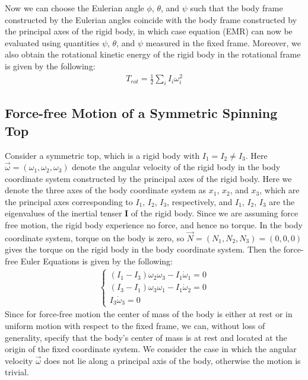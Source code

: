 \documentclass[11pt,oneside]{book}
\theoremstyle{break}
\theoremstyle{break}
\begin{document}
Now we can choose the Eulerian angle $\phi$, $\theta$, and $\psi$  such that the body frame constructed by the Eulerian angles coincide with the body frame constructed by the principal axes of the rigid body,  in which case equation (EMR) can now be evaluated using quantities $\psi$, $\theta$, and $\psi$ measured in the fixed frame. Moreover, we also obtain the rotational kinetic energy of the rigid body in the rotational frame is given by the following:
\begin{align*}
T_{rot}= \frac{1}{2}\sum_i I_i \omega_i^2
\end{align*}

\subsection*{Force-free Motion of a Symmetric Spinning Top}
Consider a symmetric top, which is a rigid body with $I_1 = I_2 \neq I_3$. Here $\vec{\omega} = (\omega_1,\omega_2,\omega_3)$ denote the angular velocity of the rigid body in the body coordinate system constructed by the principal axes of the rigid body. Here we denote the three axes of the body coordinate system as $x_1$, $x_2$, and $x_3$, which are the principal axes corresponding to $I_1$, $I_2$, $I_3$, respectively, and $I_1$, $I_2$, $I_3$ are the eigenvalues of the inertial tenser $\mathbf{I}$ of the rigid body. Since we are assuming force free motion, the rigid body experience no force, and hence no torque. In the body coordinate system, torque on the body is zero, so $\vec{N} = (N_1,N_2,N_3) = (0,0,0)$ gives the torque on the rigid body in the body coordinate system. Then the force-free Euler Equations is given by the following:
\begin{align*}
\begin{cases}
(I_1 - I_3) \omega_2 \omega_3 - I_1 \dot{\omega}_1 = 0 \\
(I_3 - I_1) \omega_3 \omega_1 - I_1\dot{\omega}_2 = 0 \\ 
I_3 \dot{\omega}_3 = 0
\end{cases} \tag{FFM}
\end{align*}
Since for force-free motion the center of mass of the body is either at rest or in uniform motion with respect to the fixed frame, we can, without loss of generality, specify that the body's center of mass is at rest and located at the origin of the fixed coordinate system. We consider the case in which the angular velocity $\vec{\omega}$ does not lie along a principal axis of the body, otherwise the motion is trivial.\\
\end{document}
